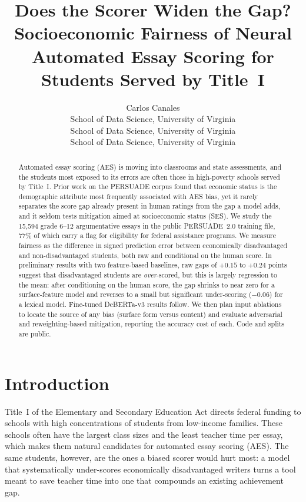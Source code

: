 \documentclass{article}
\title{Does the Scorer Widen the Gap? Socioeconomic Fairness of Neural Automated Essay Scoring for Students Served by Title~I}
\author{
  Carlos Canales \\ School of Data Science, University of Virginia
  \And
  \TODO{Teammate 2} \\ School of Data Science, University of Virginia
  \And
  \TODO{Teammate 3} \\ School of Data Science, University of Virginia
}
\begin{document}
\maketitle

\begin{abstract}
Automated essay scoring (AES) is moving into classrooms and state assessments, and the students most exposed to its errors are often those in high-poverty schools served by Title~I. Prior work on the PERSUADE corpus found that economic status is the demographic attribute most frequently associated with AES bias, yet it rarely separates the score gap already present in human ratings from the gap a model adds, and it seldom tests mitigation aimed at socioeconomic status (SES). We study the 15{,}594 grade 6--12 argumentative essays in the public PERSUADE~2.0 training file, 77\% of which carry a flag for eligibility for federal assistance programs. We measure fairness as the difference in signed prediction error between economically disadvantaged and non-disadvantaged students, both raw and conditional on the human score. In preliminary results with two feature-based baselines, raw gaps of $+0.15$ to $+0.24$ points suggest that disadvantaged students are \emph{over}-scored, but this is largely regression to the mean: after conditioning on the human score, the gap shrinks to near zero for a surface-feature model and reverses to a small but significant under-scoring ($-0.06$) for a lexical model. Fine-tuned DeBERTa-v3 results follow. We then plan input ablations to locate the source of any bias (surface form versus content) and evaluate adversarial and reweighting-based mitigation, reporting the accuracy cost of each. Code and splits are public.
\end{abstract}

\section{Introduction}
\label{sec:intro}

Title~I of the Elementary and Secondary Education Act directs federal funding to schools with high concentrations of students from low-income families. These schools often have the largest class sizes and the least teacher time per essay, which makes them natural candidates for automated essay scoring (AES). The same students, however, are the ones a biased scorer would hurt most: a model that systematically under-scores economically disadvantaged writers turns a tool meant to save teacher time into one that compounds an existing achievement gap.
\end{document}
